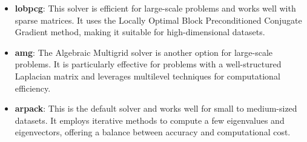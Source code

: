   \begin{itemize}
    \item \textbf{lobpcg}: This solver is efficient for large-scale problems and works well with sparse matrices. It uses the Locally Optimal Block Preconditioned Conjugate Gradient method, making it suitable for high-dimensional datasets.
    \item \textbf{amg}: The Algebraic Multigrid solver is another option for large-scale problems. It is particularly effective for problems with a well-structured Laplacian matrix and leverages multilevel techniques for computational efficiency.
    \item \textbf{arpack}: This is the default solver and works well for small to medium-sized datasets. It employs iterative methods to compute a few eigenvalues and eigenvectors, offering a balance between accuracy and computational cost.
\end{itemize}

